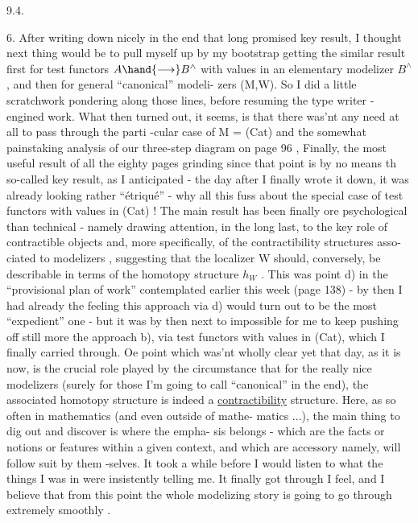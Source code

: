 
9.4.

6.     After writing down nicely\hand{,} in the end\hand{,} that long promised key
result,  I thought next thing would be to pull myself up by my bootstrap\unsure{,}
getting the similar result first for test functors $A\hand{\longrightarrow} B^{\wedge}$ with values
in an elementary modelizer $B^{\wedge}$,  and then for general ``canonical'' modeli-%
zers (M,W).  So I did a little scratchwork pondering along those lines,
before resuming the type writer - engined work.  What then turned out,
it seems,  is that there was'nt any need at all to pass through the parti%
-cular case of M = (Cat) and the somewhat painstaking analysis of our 
three-step diagram on page 96 ,  Finally,  the most useful result of all
the eighty pages grinding\hand{,} since that point\hand{,} is by no means th so-called
key result,  as I anticipated  -  the day after I finally wrote it down,
it was already looking rather ``étriqué'' -  why all this fuss about 
the special case of  test functors with values in (Cat) !  The main
result has been finally ore psychological than technical  -  namely
drawing attention,  in the long last,  to the key role of contractible
objects and,  more specifically,  of the contractibility structures asso-%
ciated to modelizers , suggesting that the localizer W  should,
conversely,  be describable in terms of the homotopy structure $h_{W}$ .  This
was point d)  in the ``provisional plan of work'' contemplated earlier this
week (page 138)  -  by then I had already the feeling this approach via
d)  would turn out to be the most ``expedient'' one  -  but it was by then
next to impossible for me to keep pushing off still more the approach b),
 via test functors with values in (Cat),  which I finally carried
through.  Oe point which was'nt wholly clear yet that day,  as it is
now,  is the crucial role played by the circumstance that for the really
nice modelizers (surely for those I'm going to call ``canonical'' in the
end),  the associated homotopy structure is indeed a \uline{contractibility}
structure.  Here,  as so often in mathematics (and even outside of mathe-%
matics ...),  the main thing to dig out and discover is where the empha-%
sis belongs  -  which are the   facts or notions or features within a
given context,  and which are accessory\hand{,} namely,  will follow suit by them%
-selves.  It took a while before I would listen to what the things I was
in were insistently telling me.  It finally got through I feel,  and I
believe that from this point  the whole modelizing story is going to go
through extremely smoothly .

